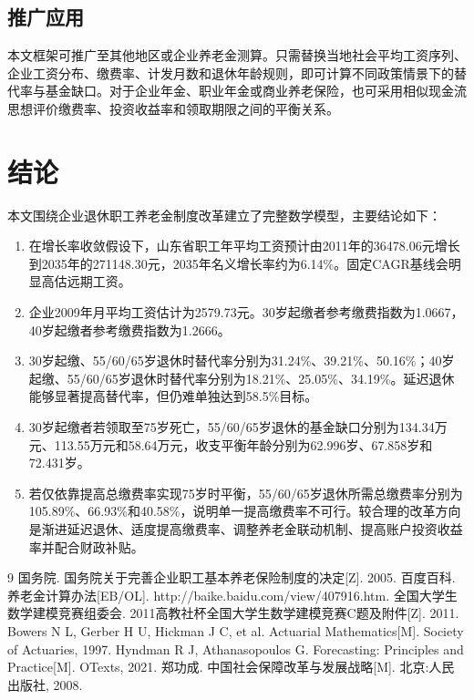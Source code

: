 \documentclass[UTF8,12pt,a4paper]{ctexart}
\begin{document}
\subsection{推广应用}
本文框架可推广至其他地区或企业养老金测算。只需替换当地社会平均工资序列、企业工资分布、缴费率、计发月数和退休年龄规则，即可计算不同政策情景下的替代率与基金缺口。对于企业年金、职业年金或商业养老保险，也可采用相似现金流思想评价缴费率、投资收益率和领取期限之间的平衡关系。

\section{结论}
本文围绕企业退休职工养老金制度改革建立了完整数学模型，主要结论如下：
\begin{enumerate}
\item 在增长率收敛假设下，山东省职工年平均工资预计由2011年的36478.06元增长到2035年的271148.30元，2035年名义增长率约为6.14\%。固定CAGR基线会明显高估远期工资。
\item 企业2009年月平均工资估计为2579.73元。30岁起缴者参考缴费指数为1.0667，40岁起缴者参考缴费指数为1.2666。
\item 30岁起缴、55/60/65岁退休时替代率分别为31.24\%、39.21\%、50.16\%；40岁起缴、55/60/65岁退休时替代率分别为18.21\%、25.05\%、34.19\%。延迟退休能够显著提高替代率，但仍难单独达到58.5\%目标。
\item 30岁起缴者若领取至75岁死亡，55/60/65岁退休的基金缺口分别为134.34万元、113.55万元和58.64万元，收支平衡年龄分别为62.996岁、67.858岁和72.431岁。
\item 若仅依靠提高总缴费率实现75岁时平衡，55/60/65岁退休所需总缴费率分别为105.89\%、66.93\%和40.58\%，说明单一提高缴费率不可行。较合理的改革方向是渐进延迟退休、适度提高缴费率、调整养老金联动机制、提高账户投资收益率并配合财政补贴。
\end{enumerate}

\begin{thebibliography}{9}
 国务院. 国务院关于完善企业职工基本养老保险制度的决定[Z]. 2005.
 百度百科. 养老金计算办法[EB/OL]. http://baike.baidu.com/view/407916.htm.
 全国大学生数学建模竞赛组委会. 2011高教社杯全国大学生数学建模竞赛C题及附件[Z]. 2011.
 Bowers N L, Gerber H U, Hickman J C, et al. Actuarial Mathematics[M]. Society of Actuaries, 1997.
 Hyndman R J, Athanasopoulos G. Forecasting: Principles and Practice[M]. OTexts, 2021.
 郑功成. 中国社会保障改革与发展战略[M]. 北京:人民出版社, 2008.
\end{thebibliography}
\end{document}
